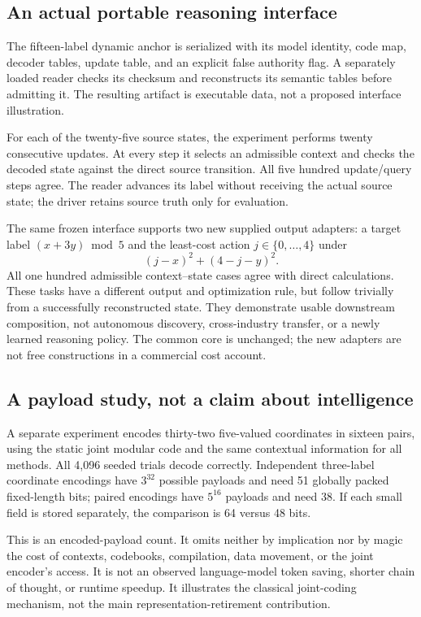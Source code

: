 \documentclass[11pt,letterpaper]{article}
\theoremstyle{remark}\newtheorem{remark}{Remark}[section]
\begin{document}
\subsection{An actual portable reasoning interface}
The fifteen-label dynamic anchor is serialized with its model identity, code map, decoder tables, update table, and an explicit false authority flag. A separately loaded reader checks its checksum and reconstructs its semantic tables before admitting it. The resulting artifact is executable data, not a proposed interface illustration.

For each of the twenty-five source states, the experiment performs twenty consecutive updates. At every step it selects an admissible context and checks the decoded state against the direct source transition. All five hundred update/query steps agree. The reader advances its label without receiving the actual source state; the driver retains source truth only for evaluation.

The same frozen interface supports two new supplied output adapters: a target label $(x+3y)\bmod5$ and the least-cost action $j\in\{0,\ldots,4\}$ under
\begin{equation}
 (j-x)^2+(4-j-y)^2.
\end{equation}
All one hundred admissible context--state cases agree with direct calculations. These tasks have a different output and optimization rule, but follow trivially from a successfully reconstructed state. They demonstrate usable downstream composition, not autonomous discovery, cross-industry transfer, or a newly learned reasoning policy. The common core is unchanged; the new adapters are not free constructions in a commercial cost account.

\subsection{A payload study, not a claim about intelligence}
A separate experiment encodes thirty-two five-valued coordinates in sixteen pairs, using the static joint modular code and the same contextual information for all methods. All 4,096 seeded trials decode correctly. Independent three-label coordinate encodings have $3^{32}$ possible payloads and need 51 globally packed fixed-length bits; paired encodings have $5^{16}$ payloads and need 38. If each small field is stored separately, the comparison is 64 versus 48 bits.

This is an encoded-payload count. It omits neither by implication nor by magic the cost of contexts, codebooks, compilation, data movement, or the joint encoder's access. It is not an observed language-model token saving, shorter chain of thought, or runtime speedup. It illustrates the classical joint-coding mechanism, not the main representation-retirement contribution.
\end{document}
